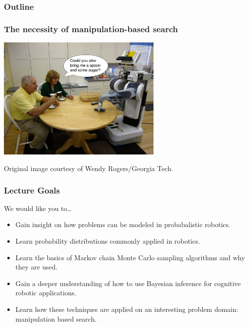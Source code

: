 \begin{frame}
  \maketitle
\end{frame}

\begin{frame}
  \frametitle{Outline}
  \tableofcontents
\end{frame}

\begin{frame}
  \frametitle{The necessity of manipulation-based search}
  \begin{center}
    \includegraphics[width=3.2in]{img/robot_in_kitchen.jpg}

    \tiny{Original image courtesy of Wendy Rogers/Georgia Tech.}
  \end{center}
\end{frame}

\begin{frame}
  \frametitle{Lecture Goals}
  We would like you to\ldots
  \begin{itemize}
    \item Gain insight on how problems can be modeled in probabalistic robotics.
    \item Learn probability distributions commonly applied in robotics.
    \item Learn the basics of Markov chain Monte Carlo sampling algorithms and
      why they are used.
    \item Gain a deeper understanding of how to use Bayesian inference for
      cognitive robotic applications.
    \item Learn how these techniques are applied on an interesting problem domain:
      manipulation based search.
  \end{itemize}
\end{frame}


